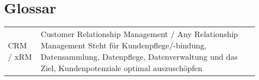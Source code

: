 \section{Glossar}
\begin{center}
	\begin{tabularx}{\textwidth}{p{}|X}
	    CRM / xRM & 
		Customer Relationship Management / Any Relationship Management
	  	Steht für Kundenpflege/-bindung, Datensammlung, Datenpflege, Datenverwaltung und das Ziel, Kundenpotenziale optimal auszuschöpfen \\ 
	\end{tabularx}
\end{center}